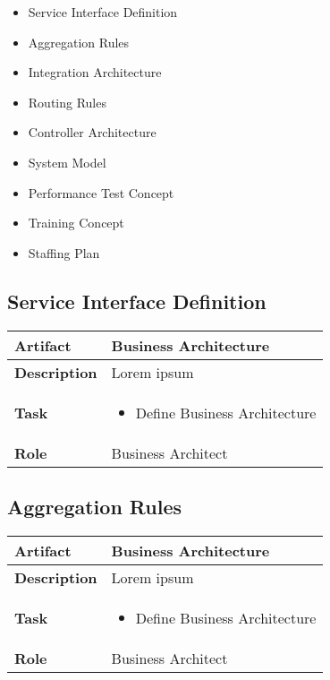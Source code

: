 \begin{itemize}
	\item Service Interface Definition
	\item Aggregation Rules
	\item Integration Architecture
	\item Routing Rules
	\item Controller Architecture
	\item System Model
	\item Performance Test Concept
	\item Training Concept
	\item Staffing Plan
\end{itemize}

\subsection{Service Interface Definition}
\begin{minipage}{\textwidth}
 \label{table:ch6_Artifact_Service_Interface_Definition}
\begin{tabular}
	{|m{2cm}|m{10cm}|} \hline \bfseries Artifact & Business Architecture\\
	\hline \bfseries Description & Lorem ipsum\\
	\hline \bfseries Task & 
	\begin{itemize}
		\item Define Business Architecture 
	\end{itemize}
	\\
	\hline \bfseries Role & Business Architect\\
	\hline 
\end{tabular}
\end{minipage}

\subsection{Aggregation Rules}
\begin{minipage}{\textwidth}
 \label{table:ch6_Artifact_Aggregation_Rules}
\begin{tabular}
	{|m{2cm}|m{10cm}|} \hline \bfseries Artifact & Business Architecture\\
	\hline \bfseries Description & Lorem ipsum\\
	\hline \bfseries Task & 
	\begin{itemize}
		\item Define Business Architecture 
	\end{itemize}
	\\
	\hline \bfseries Role & Business Architect\\
	\hline 
\end{tabular}
\end{minipage}

